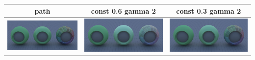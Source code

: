 \documentclass[11pt]{article}
\begin{document}
\begin{table}[ht]
  \centering
  \begin{tabular}{ | c | c | c |}
    \hline
    path & const 0.6 gamma 2 & const 0.3 gamma 2 \\ \hline
    \begin{minipage}{.3\textwidth}
      \includegraphics[scale=0.1]{img/obj/plastics_el/plastics_el.jpg}
    \end{minipage}
    &
    \begin{minipage}{.3\textwidth}
      \includegraphics[scale=0.1]{img/obj/plastics_el/plastics_el_disney.jpg}
    \end{minipage}
    & 
    \begin{minipage}{.3\textwidth}
      \includegraphics[scale=0.1]{img/obj/plastics_el/plastics_el_disney_dc03.jpg}
    \end{minipage}
    \\ \hline
  \end{tabular}
\end{table}
\end{document}
